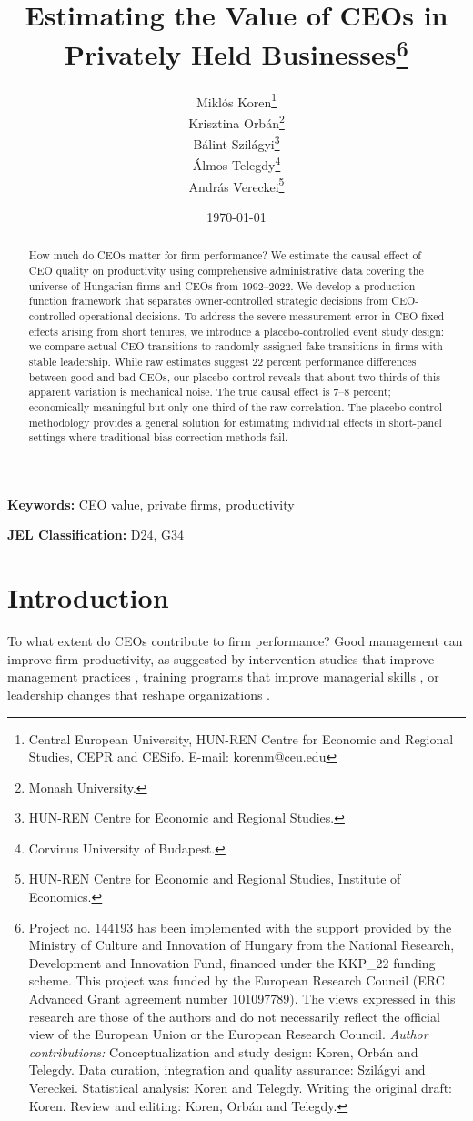 \documentclass[11pt,a4paper]{article}
\title{Estimating the Value of CEOs in Privately Held Businesses\thanks{Project no. 144193 has been implemented with the support provided by the Ministry of Culture and Innovation of Hungary from the National Research, Development and Innovation Fund, financed under the KKP\_22 funding scheme. This project was funded by the European Research Council (ERC Advanced Grant agreement number 101097789). The views expressed in this research are those of the authors and do not necessarily reflect the official view of the European Union or the European Research Council. \emph{Author contributions:} Conceptualization and study design: Koren, Orbán and Telegdy. Data curation, integration and quality assurance: Szilágyi and Vereckei. Statistical analysis: Koren and Telegdy. Writing the original draft: Koren. Review and editing: Koren, Orbán and Telegdy.}}
\author{Miklós Koren\thanks{Central European University, HUN-REN Centre for Economic and Regional Studies, CEPR and CESifo. E-mail: korenm@ceu.edu} \\
        Krisztina Orbán\thanks{Monash University.} \\
        Bálint Szilágyi\thanks{HUN-REN Centre for Economic and Regional Studies.} \\
        Álmos Telegdy\thanks{Corvinus University of Budapest.} \\
        András Vereckei\thanks{HUN-REN Centre for Economic and Regional Studies, Institute of Economics.}}
\date{\today}
\begin{document}
\maketitle

\begin{abstract}
How much do CEOs matter for firm performance? We estimate the causal effect of CEO quality on productivity using comprehensive administrative data covering the universe of Hungarian firms and CEOs from 1992--2022. We develop a production function framework that separates owner-controlled strategic decisions from CEO-controlled operational decisions. To address the severe measurement error in CEO fixed effects arising from short tenures, we introduce a placebo-controlled event study design: we compare actual CEO transitions to randomly assigned fake transitions in firms with stable leadership. While raw estimates suggest 22 percent performance differences between good and bad CEOs, our placebo control reveals that about two-thirds of this apparent variation is mechanical noise. The true causal effect is 7--8 percent; economically meaningful but only one-third of the raw correlation. The placebo control methodology provides a general solution for estimating individual effects in short-panel settings where traditional bias-correction methods fail.
\end{abstract}

\textbf{Keywords:} CEO value, private firms, productivity

\textbf{JEL Classification:} D24, G34

\newpage

\section{Introduction}

To what extent do CEOs contribute to firm performance? Good management can improve firm productivity, as suggested by intervention studies that improve management practices \citep{bloom2013does}, training programs that improve managerial skills \citep{mckenzie2021small}, or leadership changes that reshape organizations \citep{Bertrand2003-io,bennedsen2020ceos,metcalfe2023managers}. 
\end{document}
